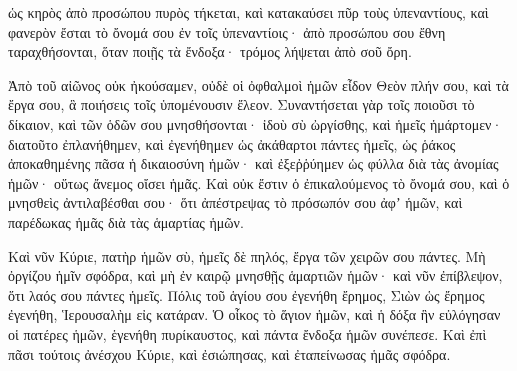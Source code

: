 {ὡς κηρὸς ἀπὸ προσώπου πυρὸς τήκεται, καὶ κατακαύσει πῦρ τοὺς ὑπεναντίους, καὶ φανερὸν ἔσται τὸ ὄνομά σου ἐν τοῖς ὑπεναντίοις· ἀπὸ προσώπου σου ἔθνη ταραχθήσονται,
ὅταν ποιῇς τὰ ἔνδοξα· τρόμος λήψεται ἀπὸ σοῦ ὄρη.
\par }{\PP {}Ἀπὸ τοῦ αἰῶνος οὐκ ἠκούσαμεν, οὐδὲ οἱ ὀφθαλμοὶ ἡμῶν εἶδον Θεὸν πλήν σου, καὶ τὰ ἔργα σου, ἃ ποιήσεις τοῖς ὑπομένουσιν ἔλεον.
Συναντήσεται γὰρ τοῖς ποιοῦσι τὸ δίκαιον, καὶ τῶν ὁδῶν σου μνησθήσονται· ἰδοὺ σὺ ὠργίσθης, καὶ ἡμεῖς ἡμάρτομεν· διατοῦτο ἐπλανήθημεν,
καὶ ἐγενήθημεν ὡς ἀκάθαρτοι πάντες ἡμεῖς, ὡς ῥάκος ἀποκαθημένης πᾶσα ἡ δικαιοσύνη ἡμῶν· καὶ ἐξεῤῥύημεν ὡς φύλλα διὰ τὰς ἀνομίας ἡμῶν· οὕτως ἄνεμος οἴσει ἡμᾶς.
Καὶ οὐκ ἔστιν ὁ ἐπικαλούμενος τὸ ὄνομά σου, καὶ ὁ μνησθεὶς ἀντιλαβέσθαι σου· ὅτι ἀπέστρεψας τὸ πρόσωπόν σου ἀφʼ ἡμῶν, καὶ παρέδωκας ἡμᾶς διὰ τὰς ἁμαρτίας ἡμῶν.
\par }{\PP {}Καὶ νῦν Κύριε, πατὴρ ἡμῶν σὺ, ἡμεῖς δὲ πηλός, ἔργα τῶν χειρῶν σου πάντες.
Μὴ ὀργίζου ἡμῖν σφόδρα, καὶ μὴ ἐν καιρῷ μνησθῇς ἁμαρτιῶν ἡμῶν· καὶ νῦν ἐπίβλεψον, ὅτι λαός σου πάντες ἡμεῖς.
Πόλις τοῦ ἁγίου σου ἐγενήθη ἔρημος, Σιὼν ὡς ἔρημος ἐγενήθη, Ἱερουσαλὴμ εἰς κατάραν.
Ὁ οἶκος τὸ ἅγιον ἡμῶν, καὶ ἡ δόξα ἣν εὐλόγησαν οἱ πατέρες ἡμῶν, ἑγενήθη πυρίκαυστος, καὶ πάντα ἔνδοξα ἡμῶν συνέπεσε.
Καὶ ἐπὶ πᾶσι τούτοις ἀνέσχου Κύριε, καὶ ἐσιώπησας, καὶ ἐταπείνωσας ἡμᾶς σφόδρα.

}
